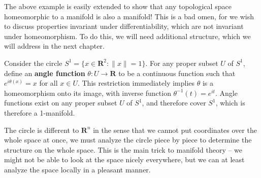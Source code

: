 The above example is easily extended to show that any topological space homeomorphic to a manifold is also a manifold! This is a bad omen, for we wish to discuss properties invariant under differentiability, which are not invariant under homeomorphism. To do this, we will need additional structure, which we will address in the next chapter.

\begin{example}
    Consider the circle $S^1 = \{ x \in \mathbf{R}^2 : \|x\| = 1 \}$. For any proper subset $U$ of $S^1$, define an {\bf angle function} $\theta:U \to \mathbf{R}$ to be a continuous function such that $e^{i\theta(x)} = x$ for all $x \in U$. This restriction immediately implies $\theta$ is a homeomorphism onto its image, with inverse function $\theta^{-1}(t) = e^{it}$. Angle functions exist on any proper subset $U$ of $S^1$, and therefore cover $S^1$, which is therefore a 1-manifold.
\end{example}

The circle is different to $\mathbf{R}^n$ in the sense that we cannot put coordinates over the whole space at once, we must analyze the circle piece by piece to determine the structure on the whole space. This is the main trick to manifold theory -- we might not be able to look at the space nicely everywhere, but we can at least analyze the space locally in a pleasant manner.

